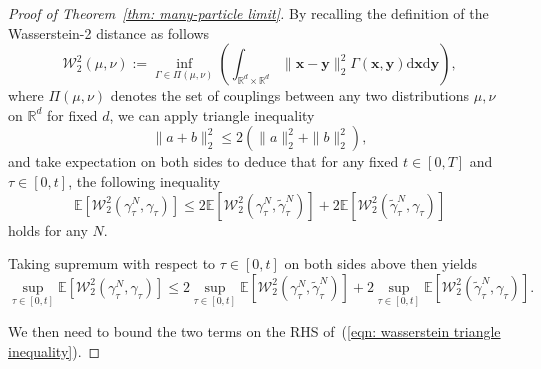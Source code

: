 \documentclass{article}
\numberwithin{equation}{section}
\def\eqref#1{(\ref{#1})}
\newcommand{\dif}{{\mathrm{d}}}
\def\vx{{\bm{x}}}
\def\vy{{\bm{y}}}
\def\gW{{\mathcal{W}}}
\newcommand{\E}{\mathbb{E}}
\begin{document}
\begin{proof}[Proof of Theorem~\ref{thm: many-particle limit}]

    By recalling the definition of the Wasserstein-2 distance as follows
    \begin{equation}
    \label{eqn: defn of wasserstein-2 distance}
    \gW_{2}^2(\mu,\nu) := \inf_{\Gamma \in \Pi(\mu,\nu)}\left(\int_{\mathbb{R}^d \times \mathbb{R}^d}\|\vx-\vy\|_2^2\Gamma(\vx,\vy)\dif\vx\dif\vy\right),
    \end{equation}
    where $\Pi(\mu,\nu)$ denotes the set of couplings between any two distributions $\mu,\nu$ on $\mathbb{R}^d$ for fixed $d$, we can apply triangle inequality 
    $$
        \|a+b\|_2^2 \leq 2\left(\|a\|_2^2 + \|b\|_2^2\right), 
    $$ 
    and take expectation on both sides to deduce that for any fixed $t \in [0,T]$ and $\tau \in [0,t]$, the following inequality
    \begin{equation}
    \label{eqn: wasserstein triangle inequality}
    \E\left[\gW^2_2(\gamma^{N}_\tau, \gamma_\tau)\right] \leq 2\E\left[\gW^2_2(\gamma^{N}_\tau, \widetilde{\gamma}^{N}_\tau)\right] + 2\E\left[\gW^2_2(\widetilde{\gamma}^{N}_\tau, \gamma_\tau)\right]
    \end{equation}
    holds for any $N$. 
    
    Taking supremum with respect to $\tau \in [0,t]$ on both sides above then yields 
    \begin{equation}
    \label{eqn: wasserstein triangle inequality sup version}
    \sup_{\tau \in [0,t]}\E\left[\gW^2_2(\gamma^{N}_\tau, \gamma_\tau)\right] \leq 2\sup_{\tau \in [0,t]}\E\left[\gW^2_2(\gamma^{N}_\tau, \widetilde{\gamma}^{N}_\tau)\right] + 2\sup_{\tau \in [0,t]}\E\left[\gW^2_2(\widetilde{\gamma}^{N}_\tau, \gamma_\tau)\right].
    \end{equation}

    We then need to bound the two terms on the RHS of~\eqref{eqn: wasserstein triangle inequality}. 
    

\end{proof}
\end{document}
